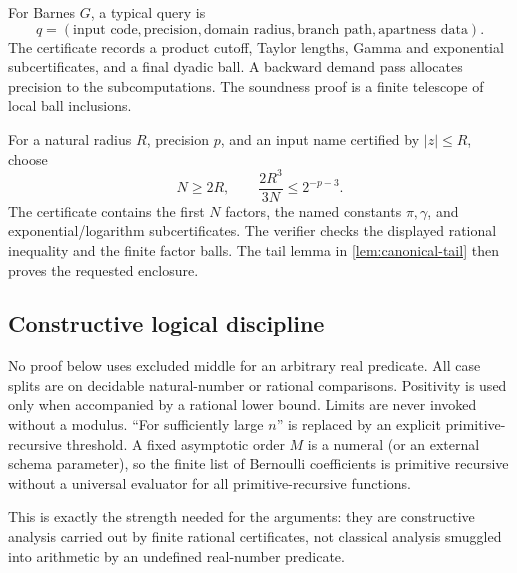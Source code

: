 For Barnes $G$, a typical query is
\[
 q=(\text{input code},\text{precision},\text{domain radius},
    \text{branch path},\text{apartness data}).
\]
The certificate records a product cutoff, Taylor lengths, Gamma and exponential
subcertificates, and a final dyadic ball.  A backward demand pass allocates
precision to the subcomputations.  The soundness proof is a finite telescope of
local ball inclusions.

\begin{contract}\label{contract:canonical-query}
For a natural radius \(R\), precision \(p\), and an input name certified by
\(|z|\le R\), choose
\[
 N\ge 2R,
 \qquad
 \frac{2R^3}{3N}\le 2^{-p-3}.
\]
The certificate contains the first \(N\) factors, the named constants
\(\pi,\gamma\), and exponential/logarithm subcertificates.  The verifier checks
the displayed rational inequality and the finite factor balls.  The tail
lemma in \cref{lem:canonical-tail} then proves the requested enclosure.
\end{contract}

\subsection{Constructive logical discipline}

No proof below uses excluded middle for an arbitrary real predicate.  All case
splits are on decidable natural-number or rational comparisons.  Positivity is
used only when accompanied by a rational lower bound.  Limits are never invoked
without a modulus.  ``For sufficiently large \(n\)'' is replaced by an explicit
primitive-recursive threshold.  A fixed asymptotic order \(M\) is a numeral (or
an external schema parameter), so the finite list of Bernoulli coefficients is
primitive recursive without a universal evaluator for all primitive-recursive
functions.

This is exactly the strength needed for the arguments: they are constructive
analysis carried out by finite rational certificates, not classical analysis
smuggled into arithmetic by an undefined real-number predicate.
